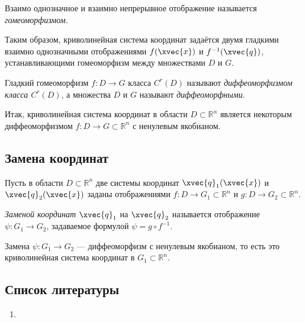 \begin{definition}
  Взаимо однозначное и взаимно непрерывное отображение называется
  \textit{гомеоморфизмом}.
\end{definition}

Таким образом, криволинейная система координат задаётся двумя гладкими взаимно
однозначными отображениями $f(\xvec{x})$ и $f^{-1}(\xvec{q})$, устанавливающими
гомеоморфизм между множествами $D$ и $G$.

\begin{definition}
  Гладкий гомеоморфизм $f : D \to G$ класса $C^r(D)$ называют
  \textit{диффеоморфизмом класса $C^r(D)$}, а множества $D$ и $G$ называют
  \textit{диффеоморфными}.
\end{definition}

Итак, криволинейная система координат в области $D \subset \mathbb{R}^n$
является некоторым диффеоморфизмом $f : D \to G \subset \mathbb{R}^n$ с
ненулевым якобианом.

\subsection{Замена координат}

Пусть в области $D \subset \mathbb{R}^n$ две системы координат
$\xvec{q}_1(\xvec{x})$ и $\xvec{q}_2(\xvec{x})$ заданы отображениями
$f : D \to G_1 \subset \mathbb{R}^n$ и $g : D \to G_2 \subset \mathbb{R}^n$.

\begin{definition}
  \textit{Заменой координат} $\xvec{q}_1$ на $\xvec{q}_2$ называется отображение
  $\psi : G_1 \to G_2$, задаваемое формулой $\psi = g \circ f^{-1}$.
\end{definition}

\begin{remark}
  Замена $\psi : G_1 \to G_2$ --- диффеоморфизм с ненулевым якобианом, то есть
  это криволинейная система координат в $G_1 \subset \mathbb{R}^n$.
\end{remark}

\begin{figure}[H]
  \centering
  

  \caption{}
  \label{fig:coords_map}
\end{figure}

\subsection{Список литературы}
\begin{enumerate}
  \item \cite{lectures}
\end{enumerate}

